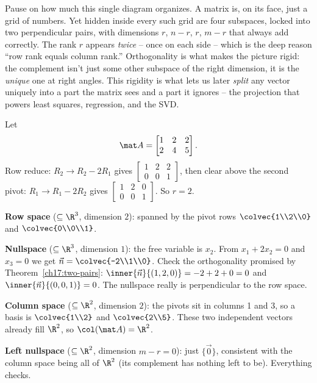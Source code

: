 \begin{aestheticbox}
Pause on how much this single diagram organizes. A matrix is, on its face, just a grid of numbers.
Yet hidden inside every such grid are four subspaces, locked into two perpendicular pairs, with
dimensions $r$, $n-r$, $r$, $m-r$ that always add correctly. The rank $r$ appears \emph{twice} --
once on each side -- which is the deep reason ``row rank equals column rank.'' Orthogonality is
what makes the picture rigid: the complement isn't just some other subspace of the right
dimension, it is the \emph{unique} one at right angles. This rigidity is what lets us later
\emph{split} any vector uniquely into a part the matrix sees and a part it ignores -- the
projection that powers least squares, regression, and the SVD.
\end{aestheticbox}

\begin{example}\label{ch17:four-spaces-worked}
Let
\[
  \mat A=\begin{bmatrix} 1 & 2 & 2\\ 2 & 4 & 5 \end{bmatrix}.
\]
Row reduce: $R_2\to R_2-2R_1$ gives $\begin{bmatrix}1&2&2\\0&0&1\end{bmatrix}$, then clear above the
second pivot: $R_1\to R_1-2R_2$ gives $\begin{bmatrix}1&2&0\\0&0&1\end{bmatrix}$. So $r=2$.

\textbf{Row space} ($\subseteq\R^3$, dimension $2$): spanned by the pivot rows
$\colvec{1\\2\\0}$ and $\colvec{0\\0\\1}$.

\textbf{Nullspace} ($\subseteq\R^3$, dimension $1$): the free variable is $x_2$. From
$x_1+2x_2=0$ and $x_3=0$ we get $\vec n=\colvec{-2\\1\\0}$. Check the orthogonality promised by
Theorem~\ref{ch17:two-pairs}: $\inner{\vec n}{(1,2,0)}=-2+2+0=0$ and $\inner{\vec n}{(0,0,1)}=0$.
The nullspace really is perpendicular to the row space.

\textbf{Column space} ($\subseteq\R^2$, dimension $2$): the pivots sit in columns 1 and 3, so a
basis is $\colvec{1\\2}$ and $\colvec{2\\5}$. These two independent vectors already fill $\R^2$, so
$\col(\mat A)=\R^2$.

\textbf{Left nullspace} ($\subseteq\R^2$, dimension $m-r=0$): just $\{\vec 0\}$, consistent with
the column space being all of $\R^2$ (its complement has nothing left to be). Everything checks.
\end{example}

